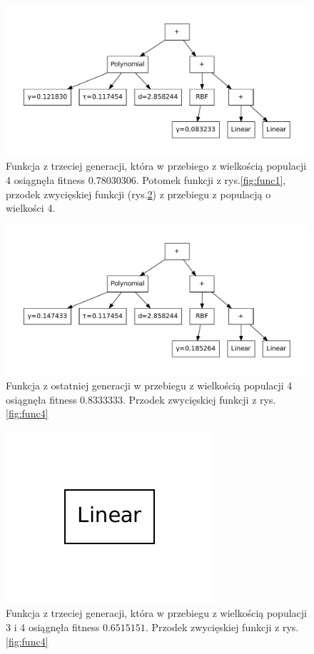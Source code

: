 \documentclass{article}
\begin{document}
	\begin{figure}[H]
		\includegraphics[scale=0.60]{figures/functions/func2}
		\caption{Funkcja z trzeciej generacji, która w przebiego z wielkością populacji 4 osiągnęła fitness $0.78030306$. Potomek funkcji z rys.\ref{fig:func1}, przodek zwycięskiej funkcji (rys.\ref{fig:func5}) z przebiegu z populacją o wielkości 4.\label{fig:func2}}
	\end{figure}
          
   	\begin{figure}[H]
		\includegraphics[scale=0.60]{figures/functions/func5}
		\caption{Funkcja z ostatniej generacji w przebiegu z wielkością populacji 4 osiągnęła fitness $0.8333333$. Przodek zwycięskiej funkcji z rys.\ref{fig:func4} \label{fig:func5}}
	\end{figure}          


   	\begin{figure}[H]
		\includegraphics[scale=0.60]{figures/functions/func3}
		\caption{Funkcja z trzeciej generacji, która w przebiegu z wielkością populacji 3 i 4 osiągnęła fitness $0.6515151$. Przodek zwycięskiej funkcji z rys.\ref{fig:func4}\label{fig:func3}}
	\end{figure}                 
\end{document}
